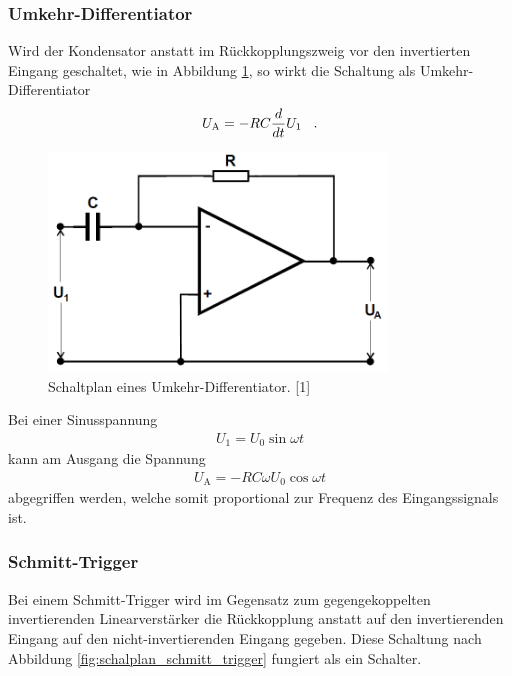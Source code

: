 \documentclass[]{scrartcl}
\begin{document}
\subsubsection{Umkehr-Differentiator}
Wird der Kondensator anstatt im Rückkopplungszweig vor den invertierten Eingang geschaltet, wie in Abbildung \ref{fig:schalplan_umkehrdifferentiator}, so wirkt die Schaltung als Umkehr-Differentiator
\begin{align}
U_\text{A}= -RC \frac{d}{d t} U_1 \hspace{0.3cm}\text{.}
\end{align}
\begin{figure}[H]
\centering
\includegraphics[width=9cm]{images/schaltplan_umkehrdifferentiator.png}
\caption{Schaltplan eines Umkehr-Differentiator. [1]}
\label{fig:schalplan_umkehrdifferentiator}
\end{figure}
Bei einer Sinusspannung
\begin{align}
U_1=U_0 \sin \omega t
\end{align}
kann am Ausgang die Spannung
\begin{align}
U_\text{A} = -RC\omega U_0 \cos \omega t
\end{align}
abgegriffen werden, welche somit proportional zur Frequenz des Eingangssignals ist.
\subsubsection{Schmitt-Trigger}
Bei einem Schmitt-Trigger wird im Gegensatz zum gegengekoppelten invertierenden Linearverstärker die Rückkopplung anstatt auf den invertierenden Eingang auf den nicht-invertierenden Eingang gegeben. Diese Schaltung nach Abbildung \ref{fig:schalplan_schmitt_trigger} fungiert als ein Schalter.
\end{document}
